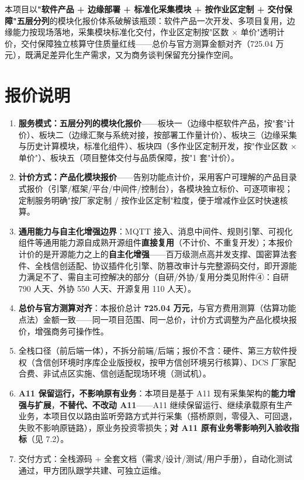 \documentclass[11pt,a4paper]{ctexart}
\begin{document}
本项目以\textbf{"软件产品 + 边缘部署 + 标准化采集模块 + 按作业区定制 + 交付保障"五层分列}的模块化报价体系破解该瓶颈：软件产品一次开发、多项目复用，边缘能力按现场落地，采集模块标准化交付，作业区定制按"区数 $\times$ 单价"透明计价，交付保障独立核算守住质量红线——总价与官方测算金额对齐（725.04 万元），既满足差异化生产需求，又为商务谈判保留充分操作空间。

\section{报价说明}

\begin{enumerate}[leftmargin=*]
  \item \textbf{服务模式：五层分列的模块化报价}——板块一（边缘中枢软件产品，按"套"计价）、板块二（边缘汇聚与系统对接，按部署工作量计价）、板块三（边缘采集与历史计算模块，标准化组件）、板块四（多作业区定制开发，按"作业区数 $\times$ 单价"）、板块五（项目整体交付与品质保障，按"1 套"计价）。
  \item \textbf{计价方式：产品化模块报价}——告别功能点计价，采用客户可理解的产品目录式报价（引擎/框架/平台/中间件/控制台），各模块独立标价、可逐项审视；定制服务明确"按厂家定制 / 按作业区定制"粒度，便于增减作业区时快速核算。
  \item \textbf{通用能力与自主化增强边界}：MQTT 接入、消息中间件、规则引擎、可视化组件等通用能力源自成熟开源组件\textbf{直接复用}（不计价、不重复开发）；本报价计价的是开源能力之上的\textbf{自主化增强}——百万级测点高并发支撑、国密算法套件、全栈信创适配、协议插件化引擎、防篡改审计与完整源码交付，即开源能力满足不了、需自主可控解决的部分（自研/外协/复用分类见附件④：自研 790 人天、外协 550 人天、开源复用 110 人天）。
  \item \textbf{总价与官方测算对齐}：本报价总计 \textbf{725.04 万元}，与官方费用测算（估算功能点法）金额一致——同一项目范围、同一总价，计价方式调整为产品化模块报价，增强商务可操作性。
  \item 全栈口径（前后端一体），不拆分前端/后端；报价不含：硬件、第三方软件授权（含信创环境时序库企业版授权，按甲方信创环境另行核算）、DCS 厂家配合费、非试点区实施、信创适配现场环境（测试机）。
  \item \textbf{A11 保留运行，不影响原有业务}：本项目是基于 A11 现有采集架构的\textbf{能力增强与扩展}，\textbf{不替代、不改动 A11}——A11 继续保留运行、继续承载原有生产业务，本项目仅以路由监听旁路方式并行采集（搭桥原则，零侵入、可回退，失败不影响原链路），原业务投资零损失；\textbf{对 A11 原有业务零影响列入验收指标}（见 7.2）。
  \item 交付方式：全栈源码 + 全套文档（需求/设计/测试/用户手册），自动化测试通过，甲方团队跟学共建、可独立运维。
\end{enumerate}
\end{document}
